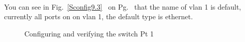 \documentclass[../EngineeringJournal_CDavis.tex]{subfiles}
\begin{document}
\\
You can see in Fig.~\ref{Sconfig9.3}~ 
on Pg.~\pageref{Sconfig9.3} that the name of vlan 1 is default, currently all
ports on on vlan 1, the default type is ethernet.

\begin{figure}[!b]\centering
{}\hfill
{}\par
\caption{Configuring and verifying the switch Pt 1}\label{Sconfig9.1}
\end{figure}
\end{document}
